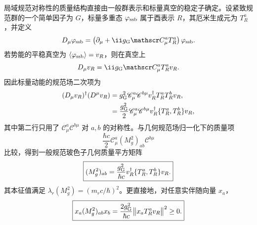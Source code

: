 局域规范对称性的质量结构直接由一般群表示和标量真空的稳定子确定。设紧致规范群的一个简单因子为 $G$，标量多重态 $\varphi_{\rm ssb}$ 属于酉表示 $R$，其厄米生成元为 $T_R^a$，并定义
\begin{equation}
 D_\mu\varphi_{\rm ssb}
 =\left(\partial_\mu+\ii g_{\rm G}\mathscr C_\mu^aT_R^a\right)\varphi_{\rm ssb}.
 \label{eq:general-ssb-covariant-derivative-dp73}
\end{equation}
若势能的平稳真空为 $\langle\varphi_{\rm ssb}\rangle=v_R$，则在真空上
\begin{equation*}
 D_\mu v_R=\ii g_{\rm G}\mathscr C_\mu^aT_R^av_R.
\end{equation*}
因此标量动能的规范场二次项为
\begin{align*}
 (D_\mu v_R)^\dagger(D^\mu v_R)
 &=g_{\rm G}^2\mathscr C_\mu^a\mathscr C^{b\mu}
 v_R^\dagger T_R^aT_R^bv_R,\\
 &=\frac{g_{\rm G}^2}{2}\mathscr C_\mu^a\mathscr C^{b\mu}
 v_R^\dagger\{T_R^a,T_R^b\}v_R,
\end{align*}
其中第二行只用了 $\mathscr C_\mu^a\mathscr C^{b\mu}$ 对 $a,b$ 的对称性。与几何规范场归一化下的质量项
\[
\frac{\hbar c}{2}\mathscr C_\mu^a(M_g^2)_{ab}\mathscr C^{b\mu}
\]
比较，得到一般规范玻色子几何质量平方矩阵
\begin{equation}
 \boxed{
 (M_g^2)_{ab}
 =\frac{g_{\rm G}^2}{\hbar c}
 v_R^\dagger\{T_R^a,T_R^b\}v_R.}
 \label{eq:general-gauge-boson-mass-matrix-dp11}
\end{equation}
其本征值满足 $\lambda_r(M_g^2)=(m_rc/\hbar)^2$。更直接地，对任意实伴随向量 $x_a$，
\begin{equation}
 \boxed{
 x_a(M_g^2)_{ab}x_b
 =\frac{2g_{\rm G}^2}{\hbar c}
 \bigl\|x_aT_R^av_R\bigr\|^2\ge0.}
 \label{eq:gauge-mass-positive-quadratic-form-dp68}
\end{equation}


